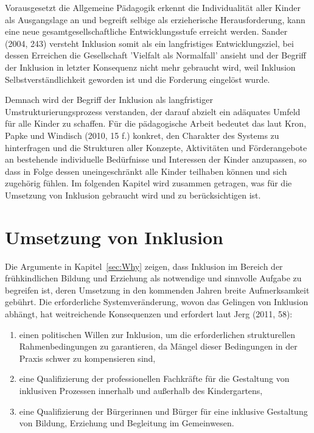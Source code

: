 Vorausgesetzt die Allgemeine Pädagogik erkennt die Individualität aller Kinder als Ausgangslage an und begreift selbige als erzieherische Herausforderung, kann eine neue gesamtgesellschaftliche Entwicklungsstufe erreicht werden. Sander (2004, 243) versteht Inklusion somit als ein langfristiges Entwicklungsziel, bei dessen Erreichen die Gesellschaft 'Vielfalt als Normalfall' ansieht und der Begriff der Inklusion in letzter Konsequenz nicht mehr gebraucht wird, weil Inklusion Selbstverständlichkeit geworden ist und die Forderung eingelöst wurde.  

Demnach wird der Begriff der Inklusion als langfristiger Umstrukturierungsprozess verstanden, der darauf abzielt ein adäquates  Umfeld für alle Kinder zu schaffen. Für die pädagogische Arbeit bedeutet das laut Kron, Papke und Windisch (2010, 15 f.) konkret, den Charakter des Systems zu hinterfragen und die Strukturen aller Konzepte, Aktivitäten und Förderangebote an bestehende individuelle Bedürfnisse und Interessen der Kinder anzupassen, so dass in Folge dessen uneingeschränkt alle Kinder teilhaben können und sich zugehörig fühlen.
Im folgenden Kapitel wird zusammen getragen, was für die Umsetzung von Inklusion gebraucht wird und zu berücksichtigen ist.

\section{Umsetzung von Inklusion}
\label{sec:Wie} 

Die Argumente in Kapitel~\ref{sec:Why} zeigen, dass Inklusion im Bereich der frühkindlichen Bildung und Erziehung als notwendige und sinnvolle Aufgabe zu begreifen ist, deren Umsetzung in den kommenden Jahren breite Aufmerksamkeit gebührt. Die erforderliche Systemveränderung, wovon das Gelingen von Inklusion abhängt, hat weitreichende Konsequenzen und erfordert laut Jerg (2011, 58):

\begin{enumerate}
\item einen politischen Willen zur Inklusion, um die erforderlichen strukturellen Rahmenbedingungen zu garantieren, da Mängel dieser Bedingungen in der Praxis schwer zu kompensieren sind,
\item eine Qualifizierung der professionellen Fachkräfte für die Gestaltung von inklusiven Prozessen innerhalb und außerhalb des Kindergartens,
\item eine Qualifizierung der Bürgerinnen und Bürger für eine inklusive Gestaltung von Bildung, Erziehung und Begleitung im Gemeinwesen.
\end{enumerate}

